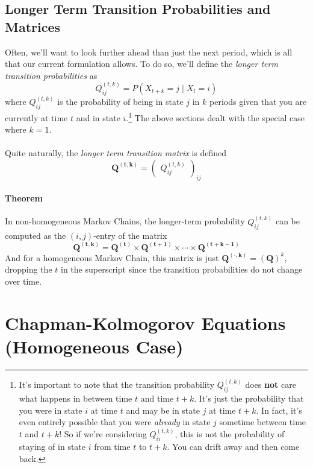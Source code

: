 \documentclass[a4paper,12pt]{scrartcl}
\begin{document}
\subsection{Longer Term Transition Probabilities and Matrices}

Often, we'll want to look further ahead than just the next period, which
is all that our current formulation allows. To do so, we'll define
the {\sl longer term transition probabilities} as 
\[ Q^{(t,k)}_{ij} = P(X_{t+k} = j \;|\; X_t = i ) \]
where $Q^{(t,k)}_{ij}$ is the probability of 
being in state $j$ in $k$ periods given that you are currently
at time $t$ and in state $i$.\footnote{It's important to note that the transition
    probability $Q^{(t,k)}_{ij}$ does \textbf{not} care what happens in between
    time $t$ and time $t+k$.  It's just the probability that you were in
    state $i$ at time $t$ and may be in state $j$ at time 
    $t+k$. In fact, it's even entirely possible 
    that you were \emph{already} in state $j$ sometime between
    time $t$ and $t+k$! So if we're considering $Q^{(t,k)}_{ii}$, 
    this is not the probability of staying of in state $i$
    from time $t$ to $t+k$.  You can drift away and then come back.}
The above sections dealt with the special case where $k=1$.
\\
\\
Quite naturally, the {\sl longer term transition matrix} is defined
\[\mathbf{Q^{(t,k)}} =
      \begin{pmatrix} Q^{(t,k)}_{ij} \end{pmatrix}_{ij}
      \]
\paragraph{Theorem} In non-homogeneous Markov Chains, the longer-term
probability $Q^{(t,k)}_{ij}$ can be computed as the $(i,j)$-entry of
the matrix 
   \[\mathbf{Q^{(t,k)}}= \mathbf{Q^{(t)}} \times \mathbf{Q^{(t+1)}} \times
      \cdots \times \mathbf{Q^{(t+k-1)}} 
            \]
And for a homogeneous Markov Chain, this matrix is just 
$\mathbf{Q^{(\cdot, k)}} = \left(\mathbf{Q}\right)^k$, dropping the
$t$ in the superscript since the transition probabilities do not 
change over time.

\section{Chapman-Kolmogorov Equations (Homogeneous Case)}
\end{document}
